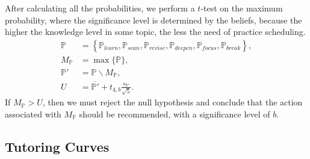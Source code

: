 \documentclass{article}
\newcommand{\0}{\mathbbold{0}}
\newcommand{\1}{\mathds{1}}
\begin{document}
After calculating all the probabilities, we perform a $t$-test on the maximum probability, where the significance level is determined by the beliefs, because the higher the knowledge level in some topic, the less the need of practice scheduling.
\begin{align*}
    \mathbb{P} &= \left\{\mathbb{P}_\mathit{learn}, \mathbb{P}_\mathit{scan}, \mathbb{P}_\mathit{revise}, \mathbb{P}_\mathit{deepen}, \mathbb{P}_\mathit{focus}, \mathbb{P}_\mathit{break}\right\}, \\
    M_\mathbb{P} &= \max\{\mathbb{P}\}, \\
    \mathbb{P}' &= \mathbb{P}\backslash M_\mathbb{P}, \\
    U &= \overline{\mathbb{P}'} + t_{4,b}\frac{s_{\mathbb{P}'}}{\sqrt{5}}.
\end{align*}
If $M_\mathbb{P} > U$, then we must reject the null hypothesis and conclude that the action associated with $M_\mathbb{P}$ should be recommended, with a significance level of $b$.

\subsection{Tutoring Curves}
\end{document}
